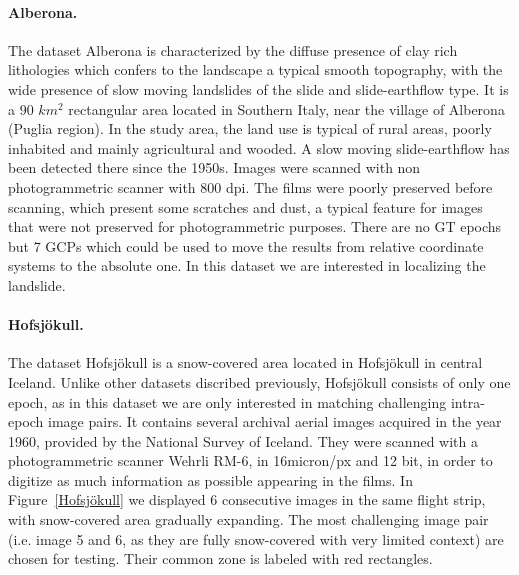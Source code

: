 \paragraph{Alberona.}
The dataset Alberona is characterized by the diffuse presence of clay rich lithologies which confers to the landscape a typical smooth topography, with the wide presence of slow moving landslides of the slide and slide-earthflow type. It is a 90 $km^2$ rectangular area located in Southern Italy, near the village of Alberona (Puglia region). 
In the study area, the land use is typical of rural areas, poorly inhabited and mainly agricultural and wooded. A slow moving slide-earthflow has been detected there since the 1950s. 
Images were scanned with non photogrammetric scanner with 800 dpi. The films were poorly preserved before scanning, which present some scratches and dust, a typical feature for images that were not preserved for photogrammetric purposes.
There are no \ac{GT} epochs but 7 \ac{GCP}s which could be used to move the results from relative coordinate systems to the absolute one.
In this dataset we are interested in localizing the landslide.

\paragraph{Hofsjökull.}
The dataset Hofsjökull is a snow-covered area located in Hofsjökull in central Iceland. Unlike other datasets discribed previously, Hofsjökull consists of only one epoch, as in this dataset we are only interested in matching challenging intra-epoch image pairs. It contains several archival aerial images acquired in the year 1960, provided by the National Survey of Iceland. They were scanned with a photogrammetric scanner Wehrli RM-6, in 16micron/px and 12 bit, in order to digitize as much information as possible appearing in the films. In Figure~\ref{Hofsjökull} we displayed 6 consecutive images in the same flight strip, with snow-covered area gradually expanding. The most challenging image pair (i.e. image 5 and 6, as they are fully snow-covered with very limited context) are chosen for testing. Their common zone is labeled with red rectangles. 

